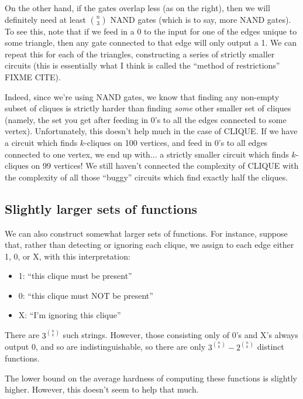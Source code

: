 \documentclass[12pt]{article}
\theoremstyle{definition}
\begin{document}
On the other hand, if the gates overlap less (as on the right),
then we will definitely need at least ${n \choose 3}$ NAND gates
(which is to say, more NAND gates).
To see this, note that if we feed in a 0 to the input for one
of the edges unique to some triangle, then any gate connected to
that edge will only output a 1. We can repeat this for each of the
triangles, constructing a series of strictly smaller circuits
(this is essentially what I think is called
the ``method of restrictions'' FIXME CITE).

Indeed, since we're using NAND gates, we know that finding any non-empty
subset of cliques is strictly harder than finding {\em some} other 
smaller set of cliques (namely, the set you get after feeding in 0's to
all the edges connected to some vertex).
Unfortunately, this doesn't help much
in the case of CLIQUE.  If we have a circuit which
finds $k$-cliques on 100 vertices, and feed in 0's to all edges connected to
one vertex, we
end up with... a strictly smaller circuit which finds $k$-cliques on
99 vertices! We still haven't connected the complexity of CLIQUE with
the complexity of all those ``buggy'' circuits which find exactly half
the cliques.


\subsection{Slightly larger sets of functions}

We can also construct somewhat larger sets of functions. For instance,
suppose that, rather than detecting or ignoring each clique, we assign
to each edge either 1, 0, or X, with this interpretation:

\begin{itemize}

\item 1: ``this clique must be present''

\item 0: ``this clique must NOT be present''

\item X: ``I'm ignoring this clique''

\end{itemize}

There are $3^{n \choose k}$ such strings. However, those consisting only of
0's and X's always output 0, and so are indistinguishable, so there are
only $3^{n \choose k} - 2^{n \choose k}$ distinct functions.

The lower bound on the average hardness of computing these functions is
slightly higher. However, this doesn't seem to help that much.
\end{document}

